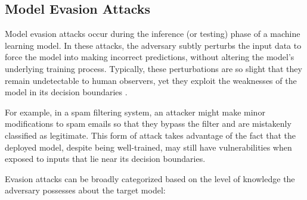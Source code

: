 \documentclass[conference]{IEEEtran}
\begin{document}



\subsection{Model Evasion Attacks}
Model evasion attacks occur during the inference (or testing) phase of a machine learning model. In these attacks, the adversary subtly perturbs the input data to force the model into making incorrect predictions, without altering the model’s underlying training process. Typically, these perturbations are so slight that they remain undetectable to human observers, yet they exploit the weaknesses of the model in its decision boundaries \cite{golla2023security, pauling2022tutorial}.

For example, in a spam filtering system, an attacker might make minor modifications to spam emails so that they bypass the filter and are mistakenly classified as legitimate. This form of attack takes advantage of the fact that the deployed model, despite being well-trained, may still have vulnerabilities when exposed to inputs that lie near its decision boundaries.

Evasion attacks can be broadly categorized based on the level of knowledge the adversary possesses about the target model:
\end{document}
